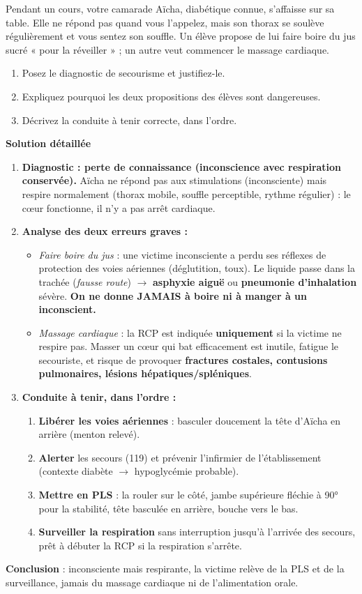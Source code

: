 \documentclass[11pt]{article}
\begin{document}
\begin{exoresolu}
Pendant un cours, votre camarade Aïcha, diabétique connue, s'affaisse sur sa table. Elle ne répond pas quand vous l'appelez, mais son thorax se soulève régulièrement et vous sentez son souffle. Un élève propose de lui faire boire du jus sucré « pour la réveiller » ; un autre veut commencer le massage cardiaque.
\begin{enumerate}
\item Posez le diagnostic de secourisme et justifiez-le.
\item Expliquez pourquoi les deux propositions des élèves sont dangereuses.
\item Décrivez la conduite à tenir correcte, dans l'ordre.
\end{enumerate}
\tcblower
\textbf{Solution détaillée}
\begin{enumerate}
\item \textbf{Diagnostic : perte de connaissance (inconscience avec respiration conservée).} Aïcha ne répond pas aux stimulations (inconsciente) mais respire normalement (thorax mobile, souffle perceptible, rythme régulier) : le cœur fonctionne, il n'y a pas arrêt cardiaque.
\item \textbf{Analyse des deux erreurs graves :}
\begin{itemize}
\item \emph{Faire boire du jus} : une victime inconsciente a perdu ses réflexes de protection des voies aériennes (déglutition, toux). Le liquide passe dans la trachée (\emph{fausse route}) $\rightarrow$ \textbf{asphyxie aiguë} ou \textbf{pneumonie d'inhalation} sévère. \textbf{On ne donne JAMAIS à boire ni à manger à un inconscient.}
\item \emph{Massage cardiaque} : la RCP est indiquée \textbf{uniquement} si la victime ne respire pas. Masser un cœur qui bat efficacement est inutile, fatigue le secouriste, et risque de provoquer \textbf{fractures costales, contusions pulmonaires, lésions hépatiques/spléniques}.
\end{itemize}
\item \textbf{Conduite à tenir, dans l'ordre :}
\begin{enumerate}
\item \textbf{Libérer les voies aériennes} : basculer doucement la tête d'Aïcha en arrière (menton relevé).
\item \textbf{Alerter} les secours (119) et prévenir l'infirmier de l'établissement (contexte diabète $\rightarrow$ hypoglycémie probable).
\item \textbf{Mettre en PLS} : la rouler sur le côté, jambe supérieure fléchie à 90° pour la stabilité, tête basculée en arrière, bouche vers le bas.
\item \textbf{Surveiller la respiration} sans interruption jusqu'à l'arrivée des secours, prêt à débuter la RCP si la respiration s'arrête.
\end{enumerate}
\end{enumerate}
\textbf{Conclusion} : inconsciente mais respirante, la victime relève de la PLS et de la surveillance, jamais du massage cardiaque ni de l'alimentation orale.
\end{exoresolu}
\end{document}
